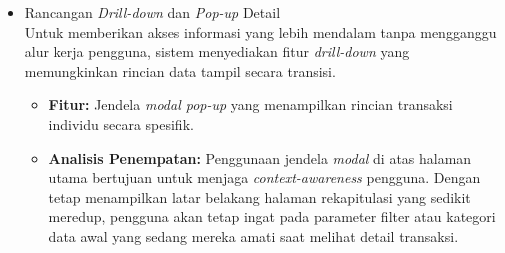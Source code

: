 \begin{itemize}
\begin{itemize}
        \item \textbf{Analisis Penempatan:}
            \begin{itemize}
                \item \textbf{Konvensi Standar Pencarian Global:} Penempatan \textbf{Pencarian Global} di bagian atas kanan mengikuti standar \emph{User Interface} yang umum, memudahkan pengguna baru untuk langsung mengenali titik awal pencarian informasi secara cepat.
                \item \textbf{Kedekatan Kontekstual:} Penempatan \textbf{Pencarian Per Kolom} dan \textbf{\emph{Header Filter}} yang melekat langsung pada baris judul kolom bertujuan untuk efisiensi kognitif. Pengguna tidak perlu memindahkan fokus pandangan terlalu jauh dari data yang sedang diamati untuk melakukan penyaringan informasi yang lebih granular.
                \item \textbf{Kontrol Presisi Data:} Dengan adanya baris filter khusus per kolom, beban kerja sistem menjadi lebih efisien karena kueri yang dikirim ke server (\emph{server-side filtering}) menjadi lebih spesifik, mengurangi potensi beban \emph{payload} data yang tidak relevan.
                \item \textbf{Manajemen Beban Visual:} \textbf{\emph{Pagination}} diletakkan di bagian akhir alur konsumsi data (bawah). Hal ini memastikan pengguna hanya fokus pada subset data tertentu pada satu waktu, yang secara teknis mendukung tujuan utama \emph{MonPD Reborn} dalam mereduksi waktu muat data secara signifikan.
            \end{itemize}
    \end{itemize}

    \item Rancangan \emph{Drill-down} dan \emph{Pop-up} Detail \\
    Untuk memberikan akses informasi yang lebih mendalam tanpa mengganggu alur kerja pengguna, sistem menyediakan fitur \emph{drill-down} yang memungkinkan rincian data tampil secara transisi.    
    \begin{itemize}
        \item \textbf{Fitur:} Jendela \emph{modal pop-up} yang menampilkan rincian transaksi individu secara spesifik.
        \item \textbf{Analisis Penempatan:} Penggunaan jendela \emph{modal} di atas halaman utama bertujuan untuk menjaga \emph{context-awareness} pengguna. Dengan tetap menampilkan latar belakang halaman rekapitulasi yang sedikit meredup, pengguna akan tetap ingat pada parameter filter atau kategori data awal yang sedang mereka amati saat melihat detail transaksi.
    \end{itemize}


\end{itemize}
